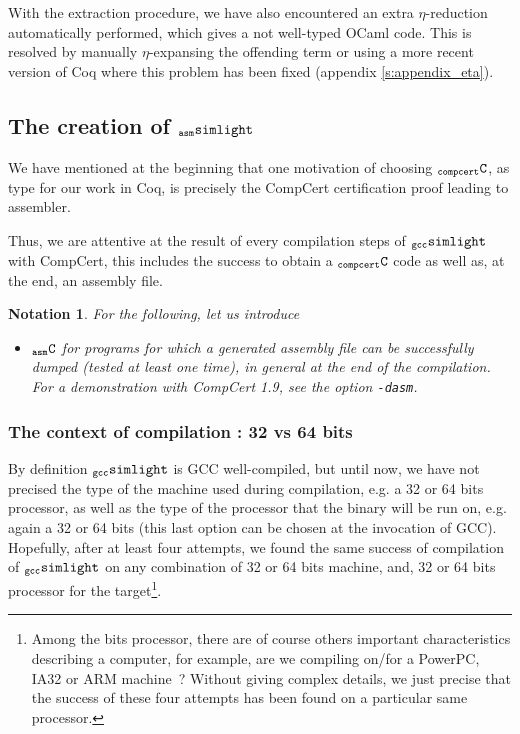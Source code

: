 \documentclass[a4paper, 11pt]{article}
\newcommand{\compcert}{CompCert 1.9\xspace}
\newcommand{\ccert}{CompCert\xspace}
\newcommand{\gccSL}{$_{\tt gcc}{\tt simlight}$\xspace}
\newcommand{\aSL}{$_{\tt asm}{\tt simlight}$\xspace} %
\newcommand{\C}{$_{\tt compcert}{\tt C}$\xspace}
\newcommand{\aC}{$_{\tt asm}{\tt C}$\xspace}
\newtheorem*{note}{Notation}
\begin{document}
With the extraction procedure, we have also encountered an extra $\eta$-reduction automatically performed, which gives a not well-typed OCaml code. This is resolved by manually $\eta$-expansing the offending term or using a more recent version of Coq where this problem has been fixed (appendix \ref{s:appendix_eta}).

\subsection{The creation of \aSL}
We have mentioned at the beginning that one motivation of choosing \C, as type for our work in Coq, is precisely the \ccert certification proof leading to assembler.

Thus, we are attentive at the result of every compilation steps of \gccSL with \ccert, this includes the success to obtain a \C code as well as, at the end, an assembly file.

\begin{note}
For the following, let us introduce
\begin{itemize}
\item \aC for programs for which a generated assembly file can be successfully dumped (tested at least one time), in general at the end of the compilation. For a demonstration with \compcert, see the option \verb|-dasm|.
\end{itemize}
\end{note}

\subsubsection{The context of compilation : 32 vs 64 bits}
\label{s:ctx_compil}
By definition \gccSL is GCC well-compiled, but until now, we have not precised the type of the machine used during compilation, e.g. a 32 or 64 bits processor, as well as the type of the processor that the binary will be run on, e.g. again a 32 or 64 bits (this last option can be chosen at the invocation of GCC). Hopefully, after at least four attempts, we found the same success of compilation of \gccSL on any combination of 32 or 64 bits machine, and, 32 or 64 bits processor for the target\footnote{Among the bits processor, there are of course others important characteristics describing a computer, for example, are we compiling on/for a PowerPC, IA32 or ARM machine~? Without giving complex details, we just precise that the success of these four attempts has been found on a particular same processor.}.
\end{document}
